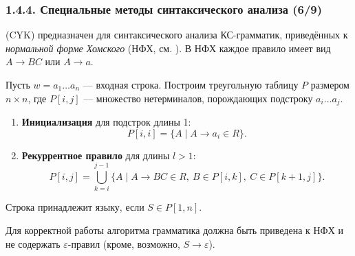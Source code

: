 \begin{frame}
\frametitle{1.4.4. Специальные методы синтаксического анализа (6/9)}
 (CYK) предназначен для синтаксического анализа КС-грамматик, приведённых к {\em нормальной форме Хомского} (НФХ, см. ).
В НФХ каждое правило имеет вид $A \to BC$ или $A \to a$.

Пусть $w = a_1 \dots a_n$ — входная строка. Построим треугольную таблицу $P$ размером $n \times n$, где $P[i,j]$ — множество нетерминалов, порождающих подстроку $a_i \dots a_j$.


\begin{enumerate}
    \item \textbf{Инициализация} для подстрок длины 1:
        \[
        P[i,i] = \{ A \mid A \to a_i \in R \}.
        \]
    \item \textbf{Рекуррентное правило} для длины $l > 1$:
        \[
        P[i,j] = \bigcup_{k=i}^{j-1} \{ A \mid A \to BC \in R,\ B \in P[i,k],\ C \in P[k+1,j] \}.
        \]
\end{enumerate}

Строка принадлежит языку, если $S \in P[1,n]$.

\begin{remark}
    Для корректной работы алгоритма грамматика должна быть приведена к НФХ и не содержать $\varepsilon$-правил (кроме, возможно, $S \to \varepsilon$).
\end{remark}
\end{frame}

